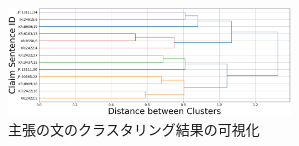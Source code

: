 \documentclass[a4paper, twocolumn, 10pt]{jarticle}
\begin{document}
\begin{figure}[H]
	\centering
	\includegraphics[keepaspectratio, width=75mm]{img/process-07_sentences-cluster_from-cluster-230_with-threshold-85_color_dendrogram_reduced-data-to-5000_Trim.png}
	\caption{
    主張の文のクラスタリング結果の可視化
  }
	\label{claim_sentences_dendrogram}
\end{figure}


\end{document}
